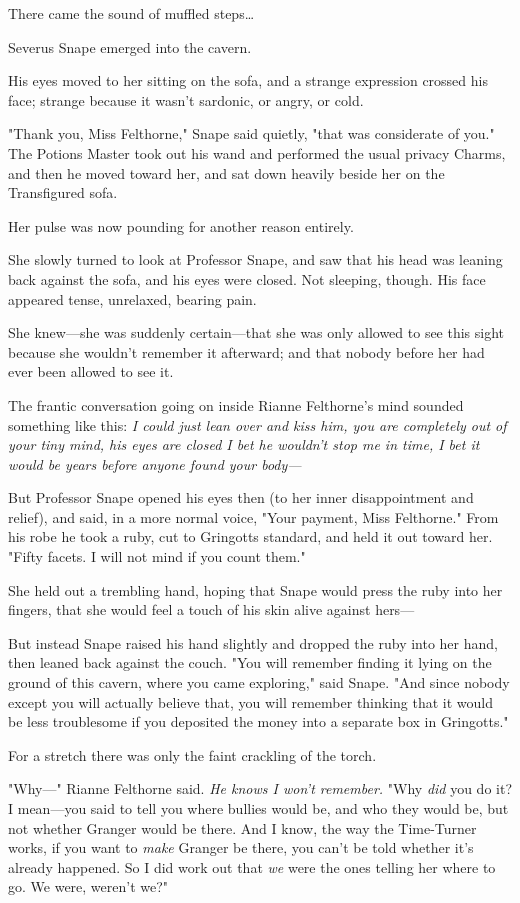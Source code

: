 There came the sound of muffled steps{\ldots}

Severus Snape emerged into the cavern.

His eyes moved to her sitting on the sofa, and a strange expression crossed his
face; strange because it wasn't sardonic, or angry, or cold.

"Thank you, Miss Felthorne," Snape said quietly, "that was considerate of you."
The Potions Master took out his wand and performed the usual privacy Charms,
and then he moved toward her, and sat down heavily beside her on the
Transfigured sofa.

Her pulse was now pounding for another reason entirely.

She slowly turned to look at Professor Snape, and saw that his head was leaning
back against the sofa, and his eyes were closed. Not sleeping, though. His face
appeared tense, unrelaxed, bearing pain.

She knew---she was suddenly certain---that she was only allowed to see this
sight because she wouldn't remember it afterward; and that nobody before her
had ever been allowed to see it.

The frantic conversation going on inside Rianne Felthorne's mind sounded
something like this: \emph{I could just lean over and kiss him, you are
completely out of your tiny mind, his eyes are closed I bet he wouldn't stop me
in time, I bet it would be years before anyone found your body---}

But Professor Snape opened his eyes then (to her inner disappointment and
relief), and said, in a more normal voice, "Your payment, Miss Felthorne." From
his robe he took a ruby, cut to Gringotts standard, and held it out toward her.
"Fifty facets. I will not mind if you count them."

She held out a trembling hand, hoping that Snape would press the ruby into her
fingers, that she would feel a touch of his skin alive against hers---

But instead Snape raised his hand slightly and dropped the ruby into her hand,
then leaned back against the couch. "You will remember finding it lying on the
ground of this cavern, where you came exploring," said Snape. "And since nobody
except you will actually believe that, you will remember thinking that it would
be less troublesome if you deposited the money into a separate box in
Gringotts."

For a stretch there was only the faint crackling of the torch.

"Why---" Rianne Felthorne said. \emph{He knows I won't remember.} "Why
\emph{did} you do it? I mean---you said to tell you where bullies would be, and
who they would be, but not whether Granger would be there. And I know, the way
the Time-Turner works, if you want to \emph{make} Granger be there, you can't
be told whether it's already happened. So I did work out that \emph{we} were
the ones telling her where to go. We were, weren't we?"

